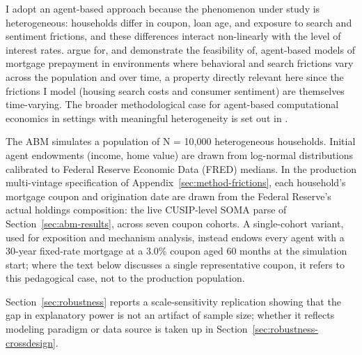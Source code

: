 \documentclass[12pt]{article}
\begin{document}
I adopt an agent-based approach because the phenomenon under study is heterogeneous: households differ in coupon, loan age, and exposure to search and sentiment frictions, and these differences interact non-linearly with the level of interest rates. \citet{geanakoplos2012} argue for, and demonstrate the feasibility of, agent-based models of mortgage prepayment in environments where behavioral and search frictions vary across the population and over time, a property directly relevant here since the frictions I model (housing search costs and consumer sentiment) are themselves time-varying. The broader methodological case for agent-based computational economics in settings with meaningful heterogeneity is set out in \citet{tesfatsion2006}.

The ABM simulates a population of N = 10,000 heterogeneous households. Initial agent endowments (income, home value) are drawn from log-normal distributions calibrated to Federal Reserve Economic Data (FRED) medians. In the production multi-vintage specification of Appendix~\ref{sec:method-frictions}, each household's mortgage coupon and origination date are drawn from the Federal Reserve's actual holdings composition: the live CUSIP-level SOMA parse of Section~\ref{sec:abm-results}, across seven coupon cohorts. A single-cohort variant, used for exposition and mechanism analysis, instead endows every agent with a 30-year fixed-rate mortgage at a 3.0\% coupon aged 60 months at the simulation start; where the text below discusses a single representative coupon, it refers to this pedagogical case, not to the production population.

Section~\ref{sec:robustness} reports a scale-sensitivity replication showing that the gap in explanatory power is not an artifact of sample size; whether it reflects modeling paradigm or data source is taken up in Section~\ref{sec:robustness-crossdesign}.
\end{document}
